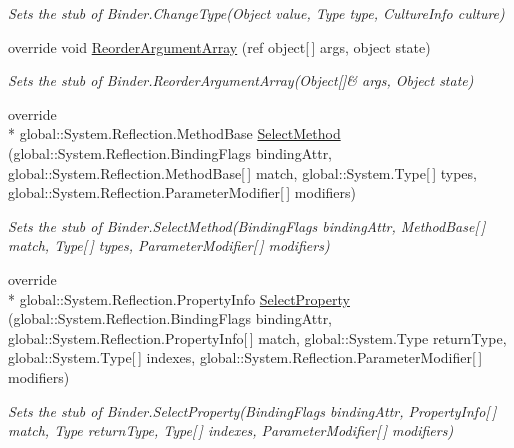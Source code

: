 \begin{DoxyCompactItemize}
\begin{DoxyCompactList}\small\item\em Sets the stub of Binder.\-Change\-Type(\-Object value, Type type, Culture\-Info culture)\end{DoxyCompactList}\item 
override void \hyperlink{class_system_1_1_reflection_1_1_fakes_1_1_stub_binder_a55b80ff071f4d7958ea77f9a787d1650}{Reorder\-Argument\-Array} (ref object\mbox{[}$\,$\mbox{]} args, object state)
\begin{DoxyCompactList}\small\item\em Sets the stub of Binder.\-Reorder\-Argument\-Array(Object\mbox{[}\mbox{]}\& args, Object state)\end{DoxyCompactList}\item 
override \\*
global\-::\-System.\-Reflection.\-Method\-Base \hyperlink{class_system_1_1_reflection_1_1_fakes_1_1_stub_binder_af578bdd4483fa0760a97b8a654f75e78}{Select\-Method} (global\-::\-System.\-Reflection.\-Binding\-Flags binding\-Attr, global\-::\-System.\-Reflection.\-Method\-Base\mbox{[}$\,$\mbox{]} match, global\-::\-System.\-Type\mbox{[}$\,$\mbox{]} types, global\-::\-System.\-Reflection.\-Parameter\-Modifier\mbox{[}$\,$\mbox{]} modifiers)
\begin{DoxyCompactList}\small\item\em Sets the stub of Binder.\-Select\-Method(\-Binding\-Flags binding\-Attr, Method\-Base\mbox{[}$\,$\mbox{]} match, Type\mbox{[}$\,$\mbox{]} types, Parameter\-Modifier\mbox{[}$\,$\mbox{]} modifiers)\end{DoxyCompactList}\item 
override \\*
global\-::\-System.\-Reflection.\-Property\-Info \hyperlink{class_system_1_1_reflection_1_1_fakes_1_1_stub_binder_a6ff6cf464efaa80ac69d349c84be9acf}{Select\-Property} (global\-::\-System.\-Reflection.\-Binding\-Flags binding\-Attr, global\-::\-System.\-Reflection.\-Property\-Info\mbox{[}$\,$\mbox{]} match, global\-::\-System.\-Type return\-Type, global\-::\-System.\-Type\mbox{[}$\,$\mbox{]} indexes, global\-::\-System.\-Reflection.\-Parameter\-Modifier\mbox{[}$\,$\mbox{]} modifiers)
\begin{DoxyCompactList}\small\item\em Sets the stub of Binder.\-Select\-Property(\-Binding\-Flags binding\-Attr, Property\-Info\mbox{[}$\,$\mbox{]} match, Type return\-Type, Type\mbox{[}$\,$\mbox{]} indexes, Parameter\-Modifier\mbox{[}$\,$\mbox{]} modifiers)\end{DoxyCompactList}\end{DoxyCompactItemize}
